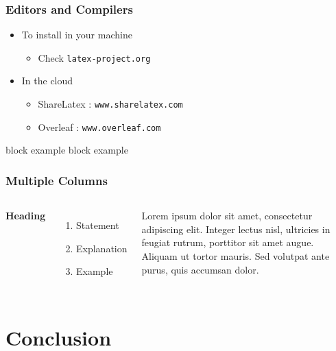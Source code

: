 \documentclass[aspectratio=169]{beamer}
\begin{document}
\begin{frame}
\frametitle{Editors and Compilers}
\begin{itemize}
\item To install in your machine
\begin{itemize}
\item Check \texttt{latex-project.org}
\end{itemize}
\item In the cloud
\begin{itemize}
\item ShareLatex : \texttt{www.sharelatex.com}
\item Overleaf : \texttt{www.overleaf.com}
\end{itemize}
\end{itemize}
\vskip 1cm
\begin{block}{block example}
block example
\end{block}
\end{frame}


\begin{frame}
\frametitle{Multiple Columns}
\begin{columns}[c]
\textbf{Heading}
\begin{enumerate}
\item Statement
\item Explanation
\item Example
\end{enumerate}
Lorem ipsum dolor sit amet, consectetur adipiscing elit. Integer lectus nisl, ultricies in feugiat rutrum, porttitor sit amet augue. Aliquam ut tortor mauris. Sed volutpat ante purus, quis accumsan dolor.
\end{columns}
\end{frame}



\section{Conclusion}
\end{document}
